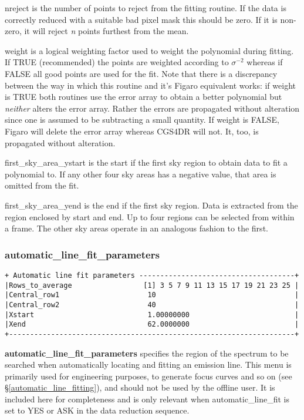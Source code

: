 {{\sf nreject} is  the number of points to reject from the fitting routine.
If the data is correctly reduced with a suitable bad pixel mask this should
be zero. If it is non-zero, it will reject {\em n} points furthest
from the mean.

{\sf weight} is a logical weighting factor used to weight the polynomial
during fitting. If TRUE (recommended) the points are weighted according to 
$\sigma^{-2}$ whereas if FALSE all good points are used for the fit. 
Note that there is
a discrepancy between the way in which this routine and it's Figaro equivalent
works: if weight is TRUE both routines use the error array to obtain a better
polynomial but {\em neither} alters the error array. Rather the errors
are propagated without alteration since one is assumed to be subtracting 
a small quantity. If weight is FALSE, Figaro will delete the error array
whereas CGS4DR will not. It, too, is propagated without alteration.

{\sf first\_sky\_area\_ystart} is the start if the first sky region to obtain
data to fit a polynomial to. If any other four sky areas has a negative
value, that area is omitted from the fit.

{\sf first\_sky\_area\_yend} is the end if the first sky region. Data is
extracted from the region enclosed by start and end.  Up to four regions
can be selected from within a frame. The other sky areas operate in an
analogous fashion to the first.

\subsubsection{automatic\_line\_fit\_parameters} 
\label{automatic_line_fit_parameters}
\begin{verbatim}
+ Automatic line fit parameters -------------------------------------+
|Rows_to_average                 [1] 3 5 7 9 11 13 15 17 19 21 23 25 |
|Central_row1                     10                                 |
|Central_row2                     40                                 |
|Xstart                           1.00000000                         |
|Xend                             62.0000000                         |
+--------------------------------------------------------------------+
\end{verbatim}

{\bf automatic\_line\_fit\_parameters} specifies the 
region of the spectrum to be searched when automatically locating and 
fitting an emission line.
This menu is primarily used for engineering purposes, to generate focus
curves  and so on (see \S \ref{automatic_line_fitting}), and should not be 
used by the offline user. It is included here for completeness and is only 
relevant when {\sf automatic\_line\_fit} is set to {\sf YES} or {\sf ASK} in the 
data reduction sequence.

}
